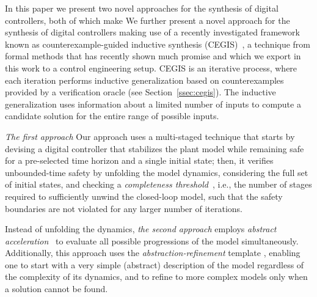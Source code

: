 \ifx\axelerator
In this paper we present two novel approaches for the synthesis of
digital controllers, both of which make 
\else
We further present a novel approach for the synthesis of digital controllers making 
\fi
use of a recently investigated framework known as counterexample-guided 
inductive synthesis (CEGIS)~\cite{jha-icse10, DBLP:conf/asplos/Solar-LezamaTBSS06},  
a technique from formal methods that has recently shown much promise and which we 
export in this work to a control engineering setup. 
CEGIS is an iterative process, where each iteration performs inductive
generalization based on counterexamples provided by a verification
oracle (see Section~\ref{ssec:cegis}). The inductive generalization uses information 
about a limited number of inputs to compute a candidate solution
for the entire range of possible inputs. 

\ifx\axelerator
\emph{The first approach} 
\else
Our approach
\fi
uses a multi-staged technique that starts by devising a
digital controller that stabilizes the plant model while remaining safe for a
pre-selected time horizon and a single initial state; then, it verifies
unbounded-time safety by unfolding the model dynamics, considering the 
full set of initial states, and checking a \emph{completeness
threshold}~\cite{DBLP:conf/vmcai/KroeningS03}, i.e., 
the number of stages required to sufficiently unwind the closed-loop model, 
such that the safety boundaries are not violated for any larger number of iterations.  

\ifx\axelerator
Instead of unfolding the dynamics, \emph{the second approach}
employs \emph{abstract acceleration}~\cite{cattaruzza2015unbounded} to
evaluate all possible progressions of the model simultaneously. 
Additionally, this approach uses the \emph{abstraction-refinement} template \cite{DBLP:conf/cav/ClarkeGJLV00},
enabling one to start with a very simple (abstract) description of the model 
regardless of the complexity of its dynamics, and to refine to more complex models only 
when a solution cannot be found.
\fi


